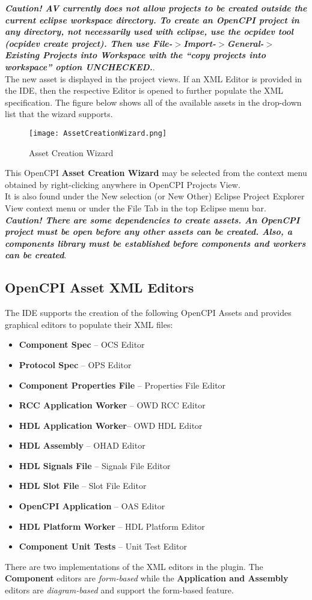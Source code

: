 \textbf{\emph{Caution! AV currently does not allow projects to be created outside the current eclipse workspace directory. To create an OpenCPI project in any directory, not necessarily used with eclipse, use the ocpidev tool (ocpidev create project). Then use File-$>$Import-$>$General-$>$Existing Projects into Workspace with the ``copy projects into workspace'' option UNCHECKED.}}.\\

The new asset is displayed in the project views. If an XML Editor is provided in the IDE, then the respective Editor is opened to further populate the XML specification. The figure below shows all of the available assets in the drop-down list that the wizard supports.
\begin{figure}[h!]
	\centering
	\caption{Asset Creation Wizard}\label{fig:AssetCreationWizard}
	\texttt{[image: AssetCreationWizard.png]}
 \end{figure}
This OpenCPI \textbf{Asset Creation Wizard} may be selected from the context menu obtained by right-clicking anywhere in OpenCPI Projects View.\\

It is also found under the New selection (or New Other) Eclipse Project Explorer View context menu or under the File Tab in the top Eclipse menu bar.\\

\textbf{\emph{Caution! There are some dependencies to create assets. An OpenCPI project must be open before any other assets can be created. Also, a components library must be established before components and workers can be created}}.

\subsection{OpenCPI Asset XML Editors}
The IDE supports the creation of the following OpenCPI Assets and provides graphical editors to populate their XML files:
\begin{itemize}
\item \textbf{Component Spec} – OCS Editor
\item \textbf{Protocol Spec} – OPS Editor
\item \textbf{Component Properties File} – Properties File Editor
\item \textbf{RCC Application Worker} – OWD RCC Editor
\item \textbf{HDL Application Worker}– OWD HDL Editor
\item \textbf{HDL Assembly} – OHAD Editor
\item \textbf{HDL Signals File} – Signals File Editor
\item \textbf{HDL Slot File} – Slot File Editor
\item \textbf{OpenCPI Application} – OAS Editor
\item \textbf{HDL Platform Worker} – HDL Platform Editor
\item \textbf{Component Unit Tests} – Unit Test Editor
\end{itemize}
There are two implementations of the XML editors in the plugin. The \textbf{Component} editors are \emph{form-based} while the \textbf{Application and Assembly} editors are \emph{diagram-based} and support the form-based feature.
